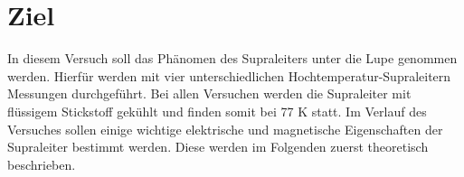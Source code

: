 \section{Ziel}
\label{sec:Ziel}
In diesem Versuch soll das Ph\"{a}nomen des Supraleiters unter die Lupe genommen werden.
Hierf\"ur werden mit vier unterschiedlichen Hochtemperatur-Supraleitern Messungen durchgef\"uhrt.
Bei allen Versuchen werden die Supraleiter mit fl\"ussigem Stickstoff gek\"uhlt und finden somit bei 77 K statt.
Im Verlauf des Versuches sollen einige wichtige elektrische und magnetische Eigenschaften der Supraleiter bestimmt werden.
Diese werden im Folgenden zuerst theoretisch beschrieben.
